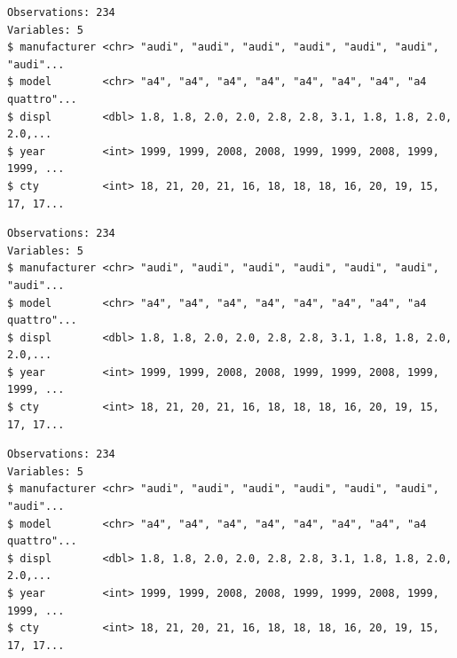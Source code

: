 \documentclass[
  11pt,
]{krantz}
\newenvironment{Shaded}{\begin{snugshade}}{\end{snugshade}}
\newcommand{\CommentTok}[1]{\textcolor[rgb]{0.37,0.37,0.37}{\textit{#1}}}
\newcommand{\KeywordTok}[1]{\textcolor[rgb]{0.27,0.27,0.27}{\textbf{#1}}}
\newcommand{\NormalTok}[1]{#1}
\newcommand{\OperatorTok}[1]{\textcolor[rgb]{0.43,0.43,0.43}{\textbf{#1}}}
\newcommand{\StringTok}[1]{\textcolor[rgb]{0.5,0.5,0.5}{#1}}
\begin{document}
\begin{verbatim}
Observations: 234
Variables: 5
$ manufacturer <chr> "audi", "audi", "audi", "audi", "audi", "audi", "audi"...
$ model        <chr> "a4", "a4", "a4", "a4", "a4", "a4", "a4", "a4 quattro"...
$ displ        <dbl> 1.8, 1.8, 2.0, 2.0, 2.8, 2.8, 3.1, 1.8, 1.8, 2.0, 2.0,...
$ year         <int> 1999, 1999, 2008, 2008, 1999, 1999, 2008, 1999, 1999, ...
$ cty          <int> 18, 21, 20, 21, 16, 18, 18, 18, 16, 20, 19, 15, 17, 17...
\end{verbatim}

\begin{Shaded}
\end{Shaded}

\begin{verbatim}
Observations: 234
Variables: 5
$ manufacturer <chr> "audi", "audi", "audi", "audi", "audi", "audi", "audi"...
$ model        <chr> "a4", "a4", "a4", "a4", "a4", "a4", "a4", "a4 quattro"...
$ displ        <dbl> 1.8, 1.8, 2.0, 2.0, 2.8, 2.8, 3.1, 1.8, 1.8, 2.0, 2.0,...
$ year         <int> 1999, 1999, 2008, 2008, 1999, 1999, 2008, 1999, 1999, ...
$ cty          <int> 18, 21, 20, 21, 16, 18, 18, 18, 16, 20, 19, 15, 17, 17...
\end{verbatim}

\begin{Shaded}
\end{Shaded}

\begin{verbatim}
Observations: 234
Variables: 5
$ manufacturer <chr> "audi", "audi", "audi", "audi", "audi", "audi", "audi"...
$ model        <chr> "a4", "a4", "a4", "a4", "a4", "a4", "a4", "a4 quattro"...
$ displ        <dbl> 1.8, 1.8, 2.0, 2.0, 2.8, 2.8, 3.1, 1.8, 1.8, 2.0, 2.0,...
$ year         <int> 1999, 1999, 2008, 2008, 1999, 1999, 2008, 1999, 1999, ...
$ cty          <int> 18, 21, 20, 21, 16, 18, 18, 18, 16, 20, 19, 15, 17, 17...
\end{verbatim}
\end{document}
